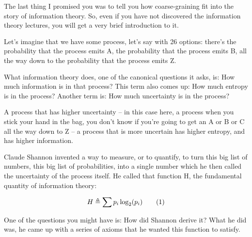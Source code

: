 \documentclass[]{article}
\newcommand\numberthis{\addtocounter{equation}{1}\tag{\theequation}}
\begin{document}
The last thing I promised you
was to tell you how coarse-graining
fit into the story of information theory.
So, even if you have not discovered
the information theory lectures,
you will get
a very brief introduction to it.

Let's imagine that we have some process,
let's say with 26 options:
there's the probability
that the process emits A,
the probability that the process emits B,
all the way down to the probability
that the process emits Z.

What information theory does,
one of the canonical questions
it asks, is:
How much information
is in that process?
This term also comes up:
How much entropy is in the process?
Another term is: How much uncertainty is in the process?

A process that has higher uncertainty –
in this case here, a process
when you stick your hand in the bag,
you don't know if you're going
to get an A or B or C
all the way down to Z –
a process that is more uncertain
has higher entropy,
and has higher information.

Claude Shannon invented a way
to measure, or to quantify,
to turn this big list of numbers,
this big list of probabilities,
into a single number which he then called
the uncertainty of the process itself.
He called that function H, the fundamental quantity
of information theory:

\begin{align*}
H \triangleq \sum p_i \log_2(p_i) \numberthis \label{eq:shannon:entropy}
\end{align*}

One of the questions you might have is: How did Shannon derive it?
What he did was, he came up with a series of axioms that he wanted this function to satisfy.
\end{document}
